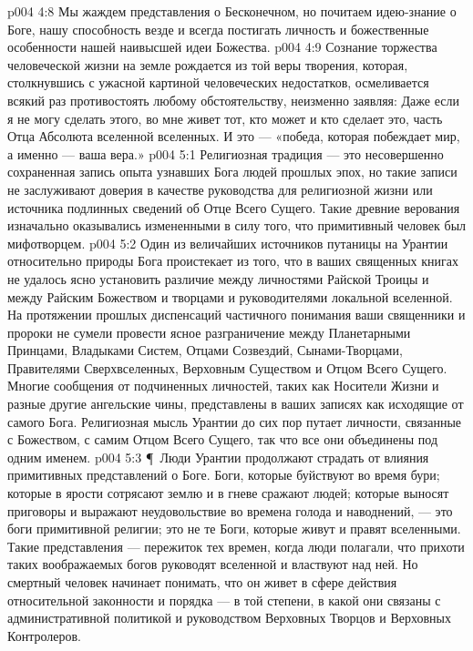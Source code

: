 \vs p004 4:8 Мы жаждем представления о Бесконечном, но почитаем идею\hyp{}знание о Боге, нашу способность везде и всегда постигать личность и божественные особенности нашей наивысшей идеи Божества.
\vs p004 4:9 Сознание торжества человеческой жизни на земле рождается из той веры творения, которая, столкнувшись с ужасной картиной человеческих недостатков, осмеливается всякий раз противостоять любому обстоятельству, неизменно заявляя: Даже если я не могу сделать этого, во мне живет тот, кто может и кто сделает это, часть Отца Абсолюта вселенной вселенных. И это --- «победа, которая побеждает мир, а именно --- ваша вера.»
\vs p004 5:1 Религиозная традиция --- это несовершенно сохраненная запись опыта узнавших Бога людей прошлых эпох, но такие записи не заслуживают доверия в качестве руководства для религиозной жизни или источника подлинных сведений об Отце Всего Сущего. Такие древние верования изначально оказывались измененными в силу того, что примитивный человек был мифотворцем.
\vs p004 5:2 Один из величайших источников путаницы на Урантии относительно природы Бога проистекает из того, что в ваших священных книгах не удалось ясно установить различие между личностями Райской Троицы и между Райским Божеством и творцами и руководителями локальной вселенной. На протяжении прошлых диспенсаций частичного понимания ваши священники и пророки не сумели провести ясное разграничение между Планетарными Принцами, Владыками Систем, Отцами Созвездий, Сынами\hyp{}Творцами, Правителями Сверхвселенных, Верховным Существом и Отцом Всего Сущего. Многие сообщения от подчиненных личностей, таких как Носители Жизни и разные другие ангельские чины, представлены в ваших записях как исходящие от самого Бога. Религиозная мысль Урантии до сих пор путает личности, связанные с Божеством, с самим Отцом Всего Сущего, так что все они объединены под одним именем.
\vs p004 5:3 \P\ Люди Урантии продолжают страдать от влияния примитивных представлений о Боге. Боги, которые буйствуют во время бури; которые в ярости сотрясают землю и в гневе сражают людей; которые выносят приговоры и выражают неудовольствие во времена голода и наводнений, --- это боги примитивной религии; это не те Боги, которые живут и правят вселенными. Такие представления --- пережиток тех времен, когда люди полагали, что прихоти таких воображаемых богов руководят вселенной и властвуют над ней. Но смертный человек начинает понимать, что он живет в сфере действия относительной законности и порядка --- в той степени, в какой они связаны с административной политикой и руководством Верховных Творцов и Верховных Контролеров.
